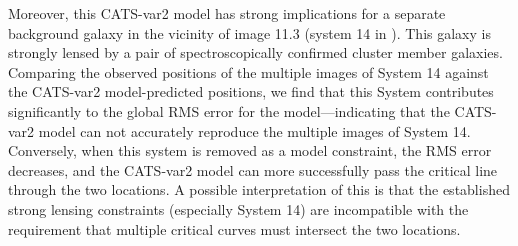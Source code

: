 Moreover, this CATS-var2 model has strong implications for a separate
background galaxy in the vicinity of image 11.3 (system 14 in
).  This galaxy is strongly lensed by a pair of
spectroscopically confirmed cluster member galaxies\citep{Caminha:2017}. Comparing the observed positions of the multiple
images of System 14 against the CATS-var2 model-predicted positions,
we find that this System contributes significantly to the global RMS
error for the model---indicating that the CATS-var2 model can not
accurately reproduce the multiple images of System 14.  Conversely,
when this system is removed as a model constraint, the RMS error
decreases, and the CATS-var2 model can more successfully pass the
critical line through the two \spock locations.  A possible
interpretation of this is that the established strong lensing
constraints (especially System 14) are incompatible with the
requirement that multiple critical curves must intersect the two
\spock locations.

